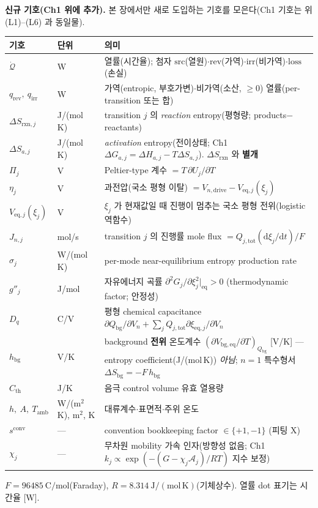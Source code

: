 \documentclass[11pt,a4paper]{article}
\newcommand{\dd}{\mathrm{d}}
\newcommand{\eq}{\mathrm{eq}}
\newcommand{\drive}{\mathrm{drive}}
\newcommand{\bg}{\mathrm{bg}}
\newcommand{\tot}{\mathrm{tot}}
\newcommand{\irr}{\mathrm{irr}}
\newcommand{\rev}{\mathrm{rev}}
\newcommand{\rxn}{\mathrm{rxn}}
\newcommand{\src}{\mathrm{src}}
\newcommand{\loss}{\mathrm{loss}}
\newcommand{\amb}{\mathrm{amb}}
\newcommand{\conv}{\mathrm{conv}}
\begin{document}
\textbf{신규 기호(Ch1 위에 추가).} 본 장에서만 새로 도입하는 기호를 모은다(Ch1 기호는 위 (L1)--(L6) 과 동일물).
\begin{longtable}{p{} p{} p{}}
\toprule 기호 & 단위 & 의미 \\ \midrule \endhead
$\dot{\mathcal Q}$ & W & 열률(시간율); 첨자 $\src$(열원)$\cdot$$\rev$(가역)$\cdot$$\irr$(비가역)$\cdot$$\loss$(손실) \\
$q_\rev,\ q_\irr$ & W & 가역(entropic, 부호가변)$\cdot$비가역(소산, $\ge0$) 열률(per-transition 또는 합) \\
$\Delta S_{\rxn,j}$ & J/(mol K) & transition $j$ 의 \emph{reaction} entropy(평형량; products$-$reactants) \\
$\Delta S_{a,j}$ & J/(mol K) & \emph{activation} entropy(전이상태; Ch1 $\Delta G_{a,j}=\Delta H_{a,j}-T\Delta S_{a,j}$). $\Delta S_{\rxn}$ 와 \textbf{별개} \\
$\Pi_j$ & V & Peltier-type 계수 $=T\,\partial U_j/\partial T$ \\
$\eta_j$ & V & 과전압(국소 평형 이탈) $=V_{n,\drive}-V_{\eq,j}(\xi_j)$ \\
$V_{\eq,j}(\xi_j)$ & V & $\xi_j$ 가 현재값일 때 진행이 멈추는 국소 평형 전위(logistic 역함수) \\
$J_{n,j}$ & mol/s & transition $j$ 의 진행률 mole flux $=Q_{j,\tot}(\dd\xi_j/\dd t)/F$ \\
$\sigma_j$ & W/(mol K) & per-mode near-equilibrium entropy production rate \\
$g''_j$ & J/mol & 자유에너지 곡률 $\partial^2 G_j/\partial\xi_j^2|_{\eq}>0$ (thermodynamic factor; 안정성) \\
$D_q$ & C/V & 평형 chemical capacitance $\partial Q_\bg/\partial V_n+\sum_jQ_{j,\tot}\partial\xi_{\eq,j}/\partial V_n$ \\
$h_\bg$ & V/K & background \textbf{전위} 온도계수 $(\partial V_{\bg,\eq}/\partial T)_{Q_\bg}$ [V/K] — entropy coefficient(J/(mol\,K)) \emph{아님}; $n=1$ 특수형서 $\Delta S_\bg=-F\,h_\bg$ \\
$C_{\mathrm{th}}$ & J/K & 음극 control volume 유효 열용량 \\
$h,\ A,\ T_\amb$ & W/(m$^2$K), m$^2$, K & 대류계수$\cdot$표면적$\cdot$주위 온도 \\
$s^{\conv}$ & --- & convention bookkeeping factor $\in\{+1,-1\}$ (피팅 X) \\
$\chi_j$ & --- & 무차원 mobility 가속 인자(방향성 없음; Ch1 $k_j\propto\exp(-(G-\chi_j\mathcal A_j)/RT)$ 지수 보정) \\
\bottomrule
\end{longtable}
$F=96485\ \mathrm{C/mol}$(Faraday), $R=8.314\ \mathrm{J/(mol\,K)}$(기체상수). 열률 dot 표기는 시간율 [W].
\end{document}
